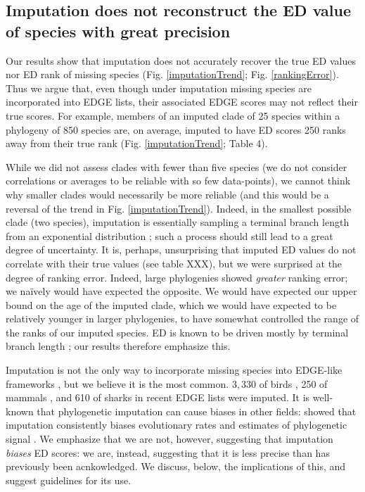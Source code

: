 \documentclass[12pt,english]{article}
\begin{document}
\subsection*{Imputation does not reconstruct the ED value of species with great precision}
Our results show that imputation does not accurately recover the true ED values
nor ED rank of missing species (Fig. \ref{imputationTrend}; Fig.
\ref{rankingError}). Thus we argue that, even though under imputation missing
species are incorporated into EDGE lists, their associated EDGE scores may not
reflect their true scores. For example, members of an imputed clade of 25
species within a phylogeny of 850 species are, on average, imputed to have ED
scores 250 ranks away from their true rank (Fig. \ref{imputationTrend}; Table
4).

While we did not assess clades with fewer than five species (we do not consider
correlations or averages to be reliable with so few data-points), we cannot
think why smaller clades would necessarily be more reliable (and this would be a
reversal of the trend in Fig. \ref{imputationTrend}). Indeed, in the smallest
possible clade (two species), imputation is essentially sampling a terminal
branch length from an exponential distribution \autocite{Kuhn2011}; such a
process should still lead to a great degree of uncertainty. It is, perhaps,
unsurprising that imputed ED values do not correlate with their true values (see
table XXX), but we were surprised at the degree of ranking error. Indeed, large
phylogenies showed \emph{greater} ranking error; we na\"{i}vely would have
expected the opposite. We would have expected our upper bound on the age of the
imputed clade, which we would have expected to be relatively younger in larger
phylogenies, to have somewhat controlled the range of the ranks of our imputed
species. ED is known to be driven mostly by terminal branch length
\autocite{Isaac2007,Steel2007}; our results therefore emphasize this.

Imputation is not the only way to incorporate missing species into EDGE-like
frameworks \autocite{Gumbs2017, Collen2011}, but we believe it is the most
common. $3,330$ of birds \autocite[\textasciitilde30\%;][]{Jetz2014}, 250 of
mammals \autocite[\textasciitilde 5.6\%;][]{Collen2011}, and 610 of sharks
\autocite[\textasciitilde49\%;][]{Stein2018} in recent EDGE lists were imputed.
It is well-known that phylogenetic imputation can cause biases in other fields:
\textcite{Rabosky2014} showed that imputation consistently biases evolutionary
rates and estimates of phylogenetic signal \autocite{Rabosky2014}. We emphasize
that we are not, however, suggesting that imputation \emph{biases} ED scores: we
are, instead, suggesting that it is less precise than has previously been
acnkowledged. We discuss, below, the implications of this, and suggest
guidelines for its use.
\end{document}

